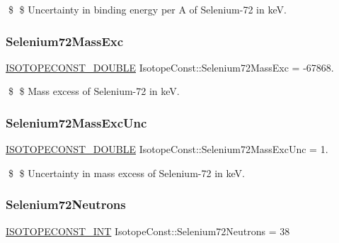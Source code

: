 \$ \$ Uncertainty in binding energy per A of Selenium-\/72 in keV. \mbox{\label{group___isotope_const-_selenium-_se72_gaa70e1e90ab7cb26747c00a40b0adf27e}} 
\subsubsection{\texorpdfstring{Selenium72\+Mass\+Exc}{Selenium72MassExc}}
{\footnotesize\ttfamily \mbox{\hyperlink{group___isotope_const-_macros_ga8f45a7272ce02c0b4c65c44636ed719a}{I\+S\+O\+T\+O\+P\+E\+C\+O\+N\+S\+T\+\_\+\+D\+O\+U\+B\+LE}} Isotope\+Const\+::\+Selenium72\+Mass\+Exc = -\/67868.}

\$ \$ Mass excess of Selenium-\/72 in keV. \mbox{\label{group___isotope_const-_selenium-_se72_gab88c7c25ab8ad7be0fbc1a642c183a44}} 
\subsubsection{\texorpdfstring{Selenium72\+Mass\+Exc\+Unc}{Selenium72MassExcUnc}}
{\footnotesize\ttfamily \mbox{\hyperlink{group___isotope_const-_macros_ga8f45a7272ce02c0b4c65c44636ed719a}{I\+S\+O\+T\+O\+P\+E\+C\+O\+N\+S\+T\+\_\+\+D\+O\+U\+B\+LE}} Isotope\+Const\+::\+Selenium72\+Mass\+Exc\+Unc = 1.}

\$ \$ Uncertainty in mass excess of Selenium-\/72 in keV. \mbox{\label{group___isotope_const-_selenium-_se72_gac887821782755eba49f25b4c381dee30}} 
\subsubsection{\texorpdfstring{Selenium72\+Neutrons}{Selenium72Neutrons}}
{\footnotesize\ttfamily \mbox{\hyperlink{group___isotope_const-_macros_ga5f18360b3e99483a35c32d789e62621c}{I\+S\+O\+T\+O\+P\+E\+C\+O\+N\+S\+T\+\_\+\+I\+NT}} Isotope\+Const\+::\+Selenium72\+Neutrons = 38}

